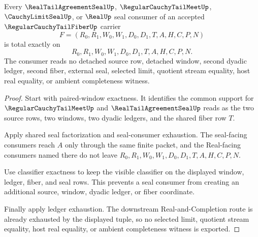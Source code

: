 \begin{theorem}
\label{thm:regular-cauchy-tail-fiber-seal-totality}
Every $\RealTailAgreementSealUp$, $\RegularCauchyTailMeetUp$,
$\CauchyLimitSealUp$, or $\RealUp$ seal consumer of an accepted
$\RegularCauchyTailFiberUp$ carrier
$$
F=(R_0,R_1,W_0,W_1,D_0,D_1,T,A,H,C,P,N)
$$
is total exactly on
$$
R_0,R_1,W_0,W_1,D_0,D_1,T,A,H,C,P,N.
$$
The consumer reads no detached source row, detached window, second dyadic
ledger, second fiber, external seal, selected limit, quotient stream equality,
host real equality, or ambient completeness witness.
\end{theorem}
\begin{proof}
Start with paired-window exactness. It identifies the common support for
$\RegularCauchyTailMeetUp$ and $\RealTailAgreementSealUp$ reads as the two
source rows, two windows, two dyadic ledgers, and the shared fiber row $T$.

Apply shared seal factorization and seal-consumer exhaustion. The seal-facing
consumers reach $A$ only through the same finite packet, and the Real-facing
consumers named there do not leave $R_0,R_1,W_0,W_1,D_0,D_1,T,A,H,C,P,N$.

Use classifier exactness to keep the visible classifier on the displayed
window, ledger, fiber, and seal rows. This prevents a seal consumer from
creating an additional source, window, dyadic ledger, or fiber coordinate.

Finally apply ledger exhaustion. The downstream Real-and-Completion route is
already exhausted by the displayed tuple, so no selected limit, quotient stream
equality, host real equality, or ambient completeness witness is exported.
\end{proof}

